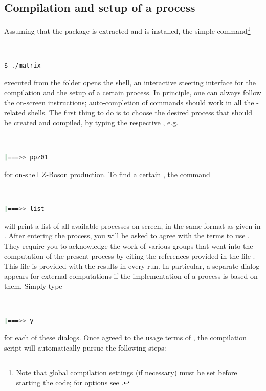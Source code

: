 \documentclass[english,11pt]{article}
\begin{document}
\subsection{Compilation and setup of a process}\label{sec:setup}
Assuming that the \Matrixversion{} package is extracted and \LHAPDF{} is installed, the simple command\footnote{Note that global compilation settings (if necessary) must be set before starting the code; for options 
see .}
\lstset{basicstyle=\small}
\lstset{keepspaces=true}
\lstset{columns=flexible}
\lstset{showstringspaces=false}
{\tt
\begin{lstlisting}[language=bash]
 $ ./matrix
\end{lstlisting}
}%
executed from the folder \Matrixversion{} opens
the \Matrix{} shell, an interactive steering interface for the compilation and the 
setup of a certain process. In principle, one can always follow the on-screen instructions; auto-completion 
of commands should work in all the \Matrix{}-related shells. The first thing to do is to 
choose the desired process that should be created and compiled, by typing the respective , e.g.\
{\tt
\begin{lstlisting}[language=bash]
 |===>> ppz01
\end{lstlisting}
}
for on-shell $Z$-Boson production. To find a certain , the command
{\tt
\begin{lstlisting}[language=bash]
 |===>> list
\end{lstlisting}
}
will print a list of all available processes on screen, in the same format as given in .
After entering the process, you will be asked to agree with the terms to use \Matrix{}. 
They require you to acknowledge the work of various groups that went into the computation of the present \Matrix{} process by citing the references provided in the file . This file is provided with the results in every \Matrix{} run. 
In particular, a separate dialog appears for
external computations if the implementation of a process is based on them. 
Simply type 
{\tt
\begin{lstlisting}[language=bash]
 |===>> y
\end{lstlisting}
}
for each of these dialogs. Once agreed to the usage terms of \Matrix{}, the compilation script will automatically pursue the following steps:
\end{document}
